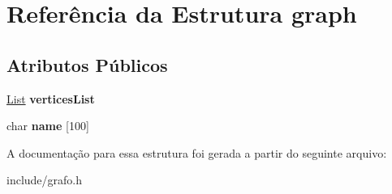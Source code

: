 \hypertarget{structgraph}{}\section{Referência da Estrutura graph}
\label{structgraph}
\subsection*{Atributos Públicos}
\begin{DoxyCompactItemize}
\item 
\mbox{\label{structgraph_a0ead4ec9235a10bc2f6cd453e508eac6}} 
\hyperlink{lista_8h_a698ff83165b8296011a50bb9aba83964}{List} {\bfseries vertices\+List}
\item 
\mbox{\label{structgraph_a1889833150d9fb8ca2618ad45b6bda43}} 
char {\bfseries name} \mbox{[}100\mbox{]}
\end{DoxyCompactItemize}


A documentação para essa estrutura foi gerada a partir do seguinte arquivo\+:\begin{DoxyCompactItemize}
\item 
include/grafo.\+h\end{DoxyCompactItemize}
